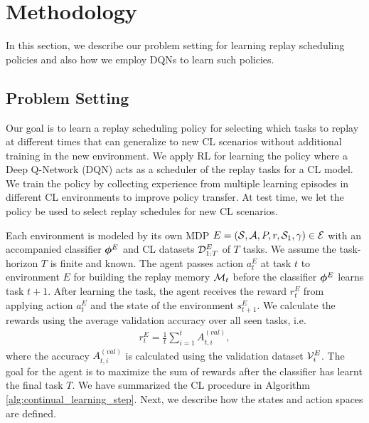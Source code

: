 
\section{Methodology}\label{paperD:sec:methodology}

In this section, we describe our problem setting for learning replay scheduling policies and also how we employ DQNs to learn such policies.



\subsection{Problem Setting}\label{paperD:sec:problem_setting}

Our goal is to learn a replay scheduling policy for selecting which tasks to replay at different times that can generalize to new CL scenarios without additional training in the new environment. We apply RL for learning the policy where a Deep Q-Network (DQN) acts as a scheduler of the replay tasks for a CL model. We train the policy by collecting experience from multiple learning episodes in different CL environments to improve policy transfer. At test time, we let the policy be used to select replay schedules for new CL scenarios.  

Each environment is modeled by its own MDP $E = ({\mathcal{S}}, {\mathcal{A}}, P, r, {\mathcal{S}}_1, \gamma) \in {\mathcal{E}}$ with an accompanied classifier ${\bm{\phi}}^{E}$ and CL datasets ${\mathcal{D}}_{1:T}^{E}$ of $T$ tasks. We assume the task-horizon $T$ is finite and known. The agent passes action $a_t^{E}$ at task $t$ to environment $E$ for building the replay memory ${\mathcal{M}}_t$ before the classifier ${\bm{\phi}}^{E}$ learns task $t+1$. After learning the task, the agent receives the reward $r_{t}^{E}$ from applying action $a_{t}^{E}$ and the state of the environment $s_{t+1}^{E}$. We calculate the rewards using the average validation accuracy over all seen tasks, i.e.
\begin{align}\label{eq:dense_reward}
    r_t^{E} = \frac{1}{t}\sum_{i=1}^{t} A_{t, i}^{(val)}, 
\end{align} 
where the accuracy $A_{t, i}^{(val)}$ is calculated using the validation dataset ${\mathcal{V}}_{i}^{E}$. The goal for the agent is to maximize the sum of rewards after the classifier has learnt the final task $T$. We have summarized the CL procedure in Algorithm \ref{alg:continual_learning_step}.
Next, we describe how the states and action spaces are defined.

